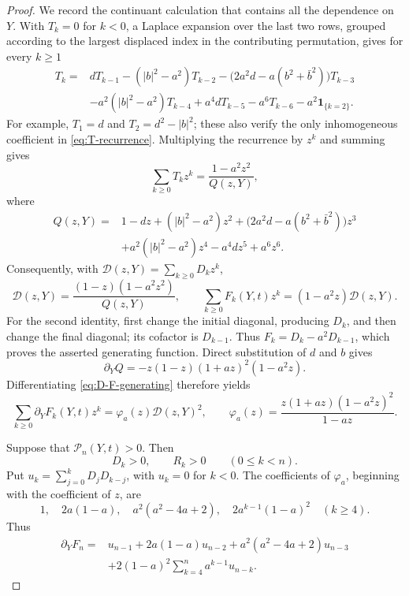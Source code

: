 \documentclass[review,hidelinks,onefignum,onetabnum]{siamart251216}
\begin{document}
\begin{proof}
We record the continuant calculation that contains all the dependence on
\(Y\).  With \(T_k=0\) for \(k<0\), a Laplace expansion over the last
two rows, grouped according to the largest displaced index in the
contributing permutation, gives for every \(k\geq1\)
\begin{equation}\label{eq:T-recurrence}
\begin{aligned}
T_k={}&dT_{k-1}-(|b|^2-a^2)T_{k-2}
-\bigl(2a^2d-a(b^2+\bar b^2)\bigr)T_{k-3}\\
&-a^2(|b|^2-a^2)T_{k-4}+a^4dT_{k-5}-a^6T_{k-6}
-a^2\boldsymbol 1_{\{k=2\}}.
\end{aligned}
\end{equation}
For example, \(T_1=d\) and \(T_2=d^2-|b|^2\); these also verify the
only inhomogeneous coefficient in \eqref{eq:T-recurrence}.  Multiplying
the recurrence by \(z^k\) and summing gives
\begin{equation}\label{eq:T-generating}
 \sum_{k\geq0}T_kz^k=\frac{1-a^2z^2}{Q(z,Y)},
\end{equation}
where
\[
\begin{aligned}
 Q(z,Y)={}&1-dz+(|b|^2-a^2)z^2
 +\bigl(2a^2d-a(b^2+\bar b^2)\bigr)z^3\\
 &+a^2(|b|^2-a^2)z^4-a^4dz^5+a^6z^6.
\end{aligned}
\]
Consequently, with \(\mathcal D(z,Y)=\sum_{k\geq0}D_kz^k\),
\begin{equation}\label{eq:D-F-generating}
 \mathcal D(z,Y)=\frac{(1-z)(1-a^2z^2)}{Q(z,Y)},\qquad
 \sum_{k\geq0}F_k(Y,t)z^k=(1-a^2z)\mathcal D(z,Y).
\end{equation}
For the second identity, first change the initial diagonal, producing
\(D_k\), and then change the final diagonal; its cofactor is
\(D_{k-1}\).  Thus \(F_k=D_k-a^2D_{k-1}\), which proves the asserted
generating function.  Direct substitution of \(d\) and \(b\) gives
\[
 \partial_YQ=-z(1-z)(1+az)^2(1-a^2z).
\]
Differentiating \eqref{eq:D-F-generating} therefore yields
\begin{equation}\label{eq:F-prime-generating}
 \sum_{k\geq0}\partial_YF_k(Y,t)z^k
 =\varphi_a(z)\mathcal D(z,Y)^2,
 \qquad
 \varphi_a(z)=\frac{z(1+az)(1-a^2z)^2}{1-az}.
\end{equation}

Suppose that \(\mathcal P_n(Y,t)>0\).  Then
\begin{equation}\label{eq:D-R-positive}
 D_k>0,\qquad R_k>0\qquad(0\leq k<n).
\end{equation}
Put \(u_k=\sum_{j=0}^kD_jD_{k-j}\), with \(u_k=0\) for \(k<0\).
The coefficients of \(\varphi_a\), beginning with the coefficient of
\(z\),
are
\[
 1,\quad 2a(1-a),\quad a^2(a^2-4a+2),\quad
 2a^{k-1}(1-a)^2\quad(k\geq4).
\]
Thus
\begin{equation}\label{eq:F-prime-convolution}
\begin{aligned}
 \partial_YF_n={}&u_{n-1}+2a(1-a)u_{n-2}
 +a^2(a^2-4a+2)u_{n-3}\\
 &+2(1-a)^2\sum_{k=4}^na^{k-1}u_{n-k}.
\end{aligned}
\end{equation}


\end{proof}
\end{document}
